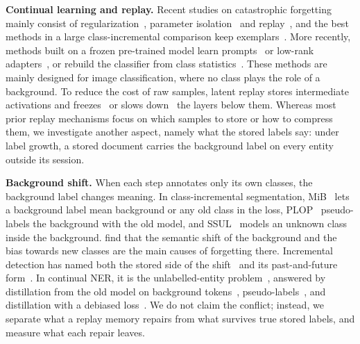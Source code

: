 \documentclass[10pt,twocolumn,letterpaper]{article}
\newcommand{\runin}[1]{\par\addvspace{0.7ex plus .3ex minus .1ex}\noindent\textbf{#1}\hspace{1em}\ignorespaces}
\begin{document}
\runin{Continual learning and replay.} Recent studies on catastrophic forgetting mainly consist of regularization~\citep{kirkpatrick2017ewc,li2017lwf}, parameter isolation~\citep{mallya2018packnet,rusu2016pnn} and replay~\citep{rolnick2019er,buzzega2020der}, and the best methods in a large class-incremental comparison keep exemplars~\citep{masana2022class}. More recently, methods built on a frozen pre-trained model learn prompts~\citep{wang2022l2p,wang2022dualprompt,smith2023coda} or low-rank adapters~\citep{wang2023olora,liang2024inflora,he2025cllora}, or rebuild the classifier from class statistics~\citep{zhang2023slca,mcdonnell2023ranpac}. These methods are mainly designed for image classification, where no class plays the role of a background. To reduce the cost of raw samples, latent replay stores intermediate activations and freezes~\citep{hayes2020remind} or slows down~\citep{pellegrini2020latent} the layers below them. Whereas most prior replay mechanisms focus on which samples to store or how to compress them, we investigate another aspect, namely what the stored labels say: under label growth, a stored document carries the background label on every entity outside its session.

\runin{Background shift.} When each step annotates only its own classes, the background label changes meaning. In class-incremental segmentation, MiB~\citep{cermelli2020mib} lets a background label mean background or any old class in the loss, PLOP~\citep{douillard2021plop} pseudo-labels the background with the old model, and SSUL~\citep{cha2021ssul} models an unknown class inside the background. \citet{kalb2022causes} find that the semantic shift of the background and the bias towards new classes are the main causes of forgetting there. Incremental detection has named both the stored side of the shift~\citep{liu2023abr} and its past-and-future form~\citep{mo2024bpf}. In continual NER, it is the unlabelled-entity problem~\citep{ma2023learning}, answered by distillation from the old model on background tokens~\citep{monaikul2021extendner,zheng2022cfner}, pseudo-labels~\citep{zhang2023cpfd}, and distillation with a debiased loss~\citep{qiu2024is3}. We do not claim the conflict; instead, we separate what a replay memory repairs from what survives true stored labels, and measure what each repair leaves.
\end{document}
